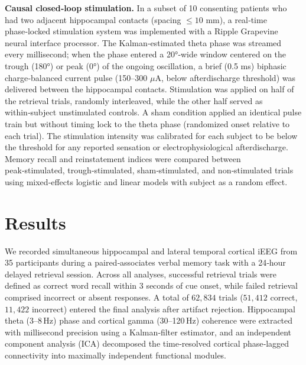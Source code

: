 \documentclass{article}
\begin{document}
\textbf{Causal closed‑loop stimulation.} In a subset of 10 consenting patients who had two adjacent hippocampal contacts (spacing $\leq 10$ mm), a real‑time phase‑locked stimulation system was implemented with a Ripple Grapevine neural interface processor. The Kalman‑estimated theta phase was streamed every millisecond; when the phase entered a 20°‑wide window centered on the trough (180°) or peak (0°) of the ongoing oscillation, a brief (0.5 ms) biphasic charge‑balanced current pulse (150–300 $\mu$A, below afterdischarge threshold) was delivered between the hippocampal contacts. Stimulation was applied on half of the retrieval trials, randomly interleaved, while the other half served as within‑subject unstimulated controls. A sham condition applied an identical pulse train but without timing lock to the theta phase (randomized onset relative to each trial). The stimulation intensity was calibrated for each subject to be below the threshold for any reported sensation or electrophysiological afterdischarge. Memory recall and reinstatement indices were compared between peak‑stimulated, trough‑stimulated, sham‑stimulated, and non‑stimulated trials using mixed‑effects logistic and linear models with subject as a random effect.

\section{Results}

We recorded simultaneous hippocampal and lateral temporal cortical iEEG from 35 participants during a paired‑associates verbal memory task with a 24‑hour delayed retrieval session. Across all analyses, successful retrieval trials were defined as correct word recall within 3 seconds of cue onset, while failed retrieval comprised incorrect or absent responses. A total of $62{,}834$ trials ($51{,}412$ correct, $11{,}422$ incorrect) entered the final analysis after artifact rejection. Hippocampal theta (3–8 Hz) phase and cortical gamma (30–120 Hz) coherence were extracted with millisecond precision using a Kalman‑filter estimator, and an independent component analysis (ICA) decomposed the time‑resolved cortical phase‑lagged connectivity into maximally independent functional modules.
\end{document}

